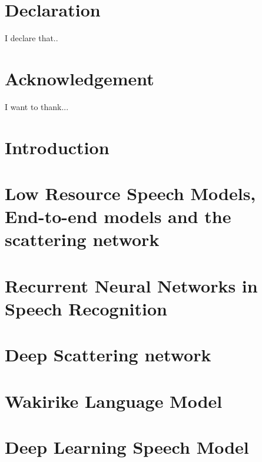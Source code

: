 \documentclass[12pt,twoside]{report}
\begin{document}
\chapter*{Declaration}
I declare that..

\chapter*{Acknowledgement}
I want to thank...

\tableofcontents

\chapter{Introduction}


\chapter{Low Resource Speech Models, End-to-end models and the scattering network}\label{c02}


\chapter{Recurrent Neural Networks in Speech Recognition}\label{ch3RNN}


\chapter{Deep Scattering network}


\chapter{Wakirike Language Model}


\chapter{Deep Learning Speech Model}





\end{document}
